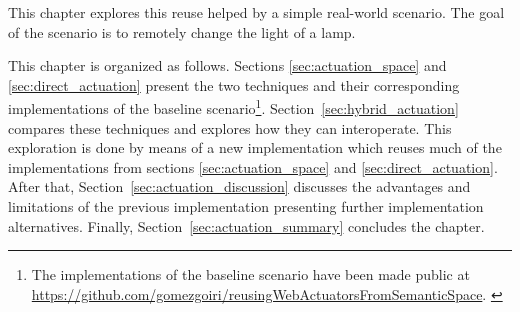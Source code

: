 This chapter explores this reuse helped by a simple real-world scenario.
The goal of the scenario is to remotely change the light of a lamp.

\bigskip

This chapter is organized as follows.
Sections \ref{sec:actuation_space} and \ref{sec:direct_actuation} present the two techniques and their corresponding implementations of the baseline scenario\footnote{
The implementations of the baseline scenario have been made public at \url{https://github.com/gomezgoiri/reusingWebActuatorsFromSemanticSpace}.
\label{fn:impl_available}
}.
Section~\ref{sec:hybrid_actuation} compares these techniques and explores how they can interoperate. %
This exploration is done by means of a new implementation which reuses much of the implementations from sections \ref{sec:actuation_space} and \ref{sec:direct_actuation}.
After that, Section~\ref{sec:actuation_discussion} discusses the advantages and limitations of the previous implementation presenting further implementation alternatives.
Finally, Section~\ref{sec:actuation_summary} concludes the chapter.








